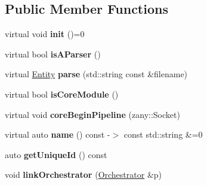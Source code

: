 \subsection*{Public Member Functions}
\begin{DoxyCompactItemize}
\item 
\mbox{\label{classzany_1_1_loader_1_1_abstract_module_a1cc8f21732c3955363508fd7001289be}} 
virtual void {\bfseries init} ()=0
\item 
\mbox{\label{classzany_1_1_loader_1_1_abstract_module_a42054eb0725757017139c447c39fdca1}} 
virtual bool {\bfseries is\+A\+Parser} ()
\item 
\mbox{\label{classzany_1_1_loader_1_1_abstract_module_a365c81da234005c89654faf4bf9fe683}} 
virtual \hyperlink{classzany_1_1_entity}{Entity} {\bfseries parse} (std\+::string const \&filename)
\item 
\mbox{\label{classzany_1_1_loader_1_1_abstract_module_a405bbce0b362ba2db0d8bc538e5f710f}} 
virtual bool {\bfseries is\+Core\+Module} ()
\item 
\mbox{\label{classzany_1_1_loader_1_1_abstract_module_a6a4f36986099f13ef9a0d9fab53fbf68}} 
virtual void {\bfseries core\+Begin\+Pipeline} (zany\+::\+Socket)
\item 
\mbox{\label{classzany_1_1_loader_1_1_abstract_module_a9f37f71825fc0b55b32c107374ce4b58}} 
virtual auto {\bfseries name} () const -\/$>$ const std\+::string \&=0
\item 
\mbox{\label{classzany_1_1_loader_1_1_abstract_module_ac1bbed96b6a3072e87d07770396ac8d4}} 
auto {\bfseries get\+Unique\+Id} () const
\item 
\mbox{\label{classzany_1_1_loader_1_1_abstract_module_a886fb096eb373e4ebaf0f30e351cdad1}} 
void {\bfseries link\+Orchestrator} (\hyperlink{classzany_1_1_orchestrator}{Orchestrator} \&p)
\end{DoxyCompactItemize}
